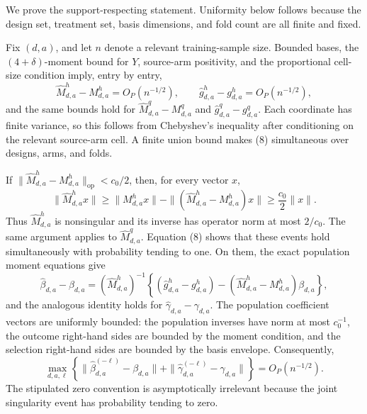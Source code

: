 We prove the support-respecting statement.  Uniformity below follows because the design set, treatment set, basis dimensions, and fold count are all finite and fixed.

Fix \((d,a)\), and let \(n\) denote a relevant training-sample size.  Bounded bases, the \((4+\delta)\)-moment bound for \(Y\), source-arm positivity, and the proportional cell-size condition imply, entry by entry,
\[
 \widehat M^h_{d,a}-M^h_{d,a}=O_P(n^{-1/2}),
 \qquad
 \widehat g^h_{d,a}-g^h_{d,a}=O_P(n^{-1/2}),                  \tag{8}
\]
and the same bounds hold for \(\widehat M^q_{d,a}-M^q_{d,a}\) and \(\widehat g^q_{d,a}-g^q_{d,a}\).  Each coordinate has finite variance, so this follows from Chebyshev's inequality after conditioning on the relevant source-arm cell.  A finite union bound makes (8) simultaneous over designs, arms, and folds.

If \(\|\widehat M^h_{d,a}-M^h_{d,a}\|_{\mathrm{op}}<c_0/2\), then, for every vector \(x\),
\[
 \|\widehat M^h_{d,a}x\|
 \ge \|M^h_{d,a}x\|
      -\|(\widehat M^h_{d,a}-M^h_{d,a})x\|
 \ge \frac{c_0}{2}\|x\|.
\]
Thus \(\widehat M^h_{d,a}\) is nonsingular and its inverse has operator norm at most \(2/c_0\).  The same argument applies to \(\widehat M^q_{d,a}\).  Equation (8) shows that these events hold simultaneously with probability tending to one.  On them, the exact population moment equations give
\[
 \widehat\beta_{d,a}-\beta_{d,a}
 = (\widehat M^h_{d,a})^{-1}
 \left\{(\widehat g^h_{d,a}-g^h_{d,a})
 -(\widehat M^h_{d,a}-M^h_{d,a})\beta_{d,a}\right\},         \tag{9}
\]
and the analogous identity holds for \(\widehat\gamma_{d,a}-\gamma_{d,a}\).  The population coefficient vectors are uniformly bounded: the population inverses have norm at most \(c_0^{-1}\), the outcome right-hand sides are bounded by the moment condition, and the selection right-hand sides are bounded by the basis envelope.  Consequently,
\[
 \max_{d,a,\ell}\left\{
 \|\widehat\beta_{d,a}^{(-\ell)}-\beta_{d,a}\|
 +\|\widehat\gamma_{d,a}^{(-\ell)}-\gamma_{d,a}\|
 \right\}=O_P(n^{-1/2}).                                     \tag{10}
\]
The stipulated zero convention is asymptotically irrelevant because the joint singularity event has probability tending to zero.

